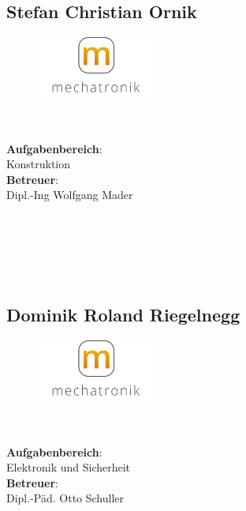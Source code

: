 \subsection*{Stefan Christian Ornik}
\begin{figure}
\begin{center}
  \includegraphics[width=0.35\textwidth]{logoMecha}
\end{center}
\end{figure}
\mbox{}\\
\mbox{}\\
\textbf{Aufgabenbereich}:\\
Konstruktion\\
\textbf{Betreuer}:\\
Dipl.-Ing Wolfgang Mader
\mbox{}\\
\mbox{}\\
\mbox{}\\
\mbox{}\\
\mbox{}\\
\mbox{}\\

\subsection*{Dominik Roland Riegelnegg}
\begin{figure}
\begin{center}
  \includegraphics[width=0.35\textwidth]{LogoMecha}
\end{center}
\end{figure}
\mbox{}\\
\mbox{}\\
\textbf{Aufgabenbereich}:\\
Elektronik und Sicherheit\\
\textbf{Betreuer}:\\
Dipl.-Päd. Otto Schuller
\mbox{}\\
\mbox{}\\
\mbox{}\\
\mbox{}\\
\mbox{}\\
\newpage

